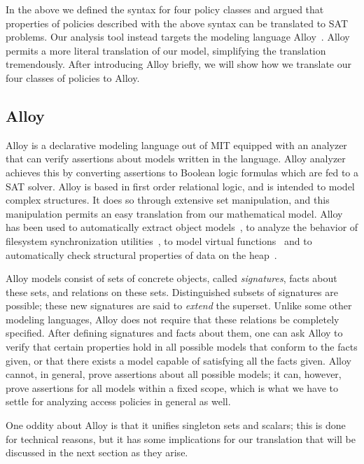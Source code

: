 In the above we defined the syntax for four policy classes and argued
that properties of policies described with the above syntax can be
translated to SAT problems.  Our analysis tool instead targets the
modeling language
Alloy~\cite{jackson:alcoa,jackson:micromodels,jackson00automating}.
Alloy permits a more literal translation of our model, simplifying the
translation tremendously. After introducing Alloy briefly, we will
show how we translate our four classes of policies to Alloy.

\subsection{Alloy}

Alloy is a declarative modeling language out of MIT equipped with an
analyzer that can verify assertions about models written in the
language.  Alloy analyzer achieves this by converting assertions to
Boolean logic formulas which are fed to a SAT solver.  Alloy is based
in first order relational logic, and is intended to model complex
structures. It does so through extensive set manipulation, and this
manipulation permits an easy translation from our mathematical model.
Alloy has been used to automatically extract object
models~\cite{jackson01lightweight,waingold01automated}, to analyze the
behavior of filesystem synchronization
utilities~\cite{nolte02filesystem}, to model virtual
functions~\cite{marinov02valloy} and to automatically check structural
properties of data on the heap~\cite{vaziri03heap}.

Alloy models consist of sets of concrete objects, called
\emph{signatures}, facts about these sets, and relations on these
sets.  Distinguished subsets of signatures are possible; these new
signatures are said to \emph{extend} the superset.  Unlike some other
modeling languages, Alloy does not require that these relations be
completely specified.  After defining signatures and facts about them,
one can ask Alloy to verify that certain properties hold in all
possible models that conform to the facts given, or that there exists
a model capable of satisfying all the facts given.  Alloy cannot, in
general, prove assertions about all possible models; it can, however,
prove assertions for all models within a fixed scope, which is what we
have to settle for analyzing access policies in general as well.

One oddity about Alloy is that it unifies singleton sets and scalars;
this is done for technical reasons, but it has some implications for
our translation that will be discussed in the next section as they
arise.

